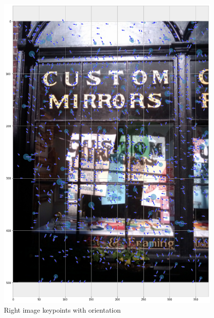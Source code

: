 \documentclass[]{article}
\begin{document}
\begin{figure}[htb]
	\centering
	\includegraphics[width=\linewidth]{CustomMirrorsRightStep3}
	\caption{Right image keypoints with orientation}
	\label{custommirrorsrightstep3}
\end{figure}
\end{document}
